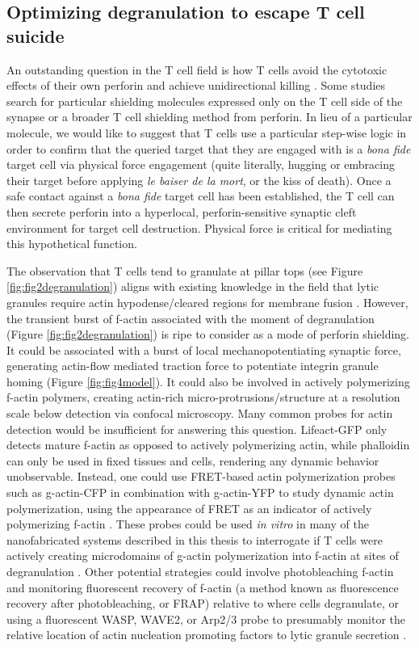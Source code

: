 \subsection{Optimizing degranulation to escape T cell suicide}
An outstanding question in the T cell field is how T cells avoid the cytotoxic effects of their own perforin and achieve unidirectional killing \cite{Lopez2013}. Some studies search for particular shielding molecules expressed only on the T cell side of the synapse \cite{Balaji2002} or a broader T cell shielding method \cite{Rudd-schmidt} from perforin. In lieu of a particular molecule, we would like to suggest that T cells use a particular step-wise logic in order to confirm that the queried target that they are engaged with is a \textit{bona fide} target cell via physical force engagement (quite literally, hugging or embracing their target before applying \textit{le baiser de la mort}, or the kiss of death). Once a safe contact against a \textit{bona fide} target cell has been established, the T cell can then secrete perforin into a hyperlocal, perforin-sensitive synaptic cleft environment for target cell destruction. Physical force is critical for mediating this hypothetical function. 

The observation that T cells tend to granulate at pillar tops (see Figure \ref{fig:fig2degranulation}) aligns with existing knowledge in the field that lytic granules require actin hypodense/cleared regions for membrane fusion \cite{Ritter2015}.  However, the transient burst of f-actin associated with the moment of degranulation (Figure \ref{fig:fig2degranulation}) is ripe to consider as a mode of perforin shielding.  It could be associated with a burst of local mechanopotentiating synaptic force,  generating actin-flow mediated traction force to potentiate integrin granule homing (Figure \ref{fig:fig4model}). It could also be involved in actively polymerizing f-actin polymers, creating actin-rich micro-protrusions/structure at a resolution scale below detection via confocal microscopy.  Many common probes for actin detection would be insufficient for answering this question. Lifeact-GFP only detects mature f-actin as opposed to actively polymerizing actin, while phalloidin can only be used in fixed tissues and cells, rendering any dynamic behavior unobservable. Instead, one could use FRET-based actin polymerization probes such as g-actin-CFP in combination with g-actin-YFP to study dynamic actin polymerization, using the appearance of FRET as an indicator of actively polymerizing f-actin \cite{LansingTaylor1981}. These probes could be used \textit{in vitro} in many of the nanofabricated systems described in this thesis to interrogate if T cells were actively creating microdomains of g-actin polymerization into f-actin at sites of degranulation \cite{Okamoto2004}. Other potential strategies could involve photobleaching f-actin and monitoring fluorescent recovery of f-actin (a method known as fluorescence recovery after photobleaching, or FRAP) \cite{Simon1988} relative to where cells degranulate, or using a fluorescent WASP, WAVE2, or Arp2/3 probe to presumably monitor the relative location of actin nucleation promoting factors to lytic granule secretion \cite{Obino2016, Tamzalit2018}. 


